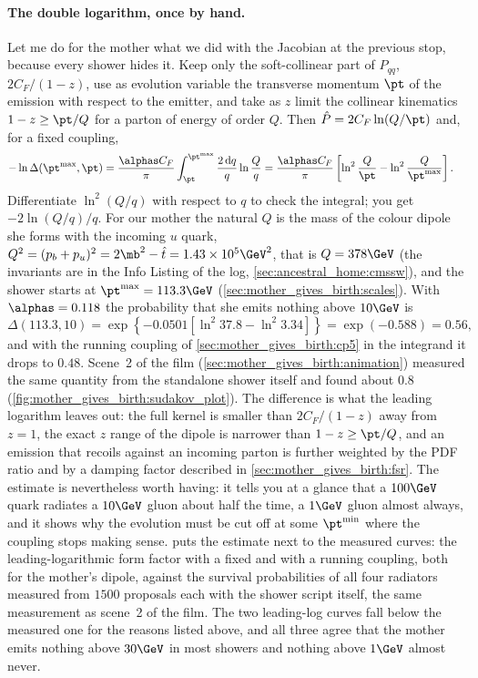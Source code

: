 \paragraph{The double logarithm, once by hand.} Let me do for the mother
what we did with the Jacobian at the previous stop, because every shower
hides it. Keep only the soft-collinear part of $P_{qq}$, $2C_F/(1-z)$,
use as evolution variable the transverse momentum $\pt$ of the emission with
respect to the emitter, and take as $z$ limit the collinear kinematics
$1-z\ge\pt/Q$ for a parton of energy of order $Q$. Then
$\hat P=2C_F\ln(Q/\pt)$ and, for a fixed coupling,
\begin{equation}
\begin{split}
  -\ln\Delta(\pt^{\max},\pt)
  &=\frac{\alphas C_F}{\pi}\int_{\pt}^{\pt^{\max}}\frac{2\,\mathrm{d}q}{q}\ln\frac{Q}{q}
  =\frac{\alphas C_F}{\pi}\left[\ln^2\frac{Q}{\pt}-\ln^2\frac{Q}{\pt^{\max}}\right].
\end{split}
  \label{eq:mother_gives_birth:double_log_sudakov}
\end{equation}
Differentiate $\ln^2(Q/q)$ with respect to $q$ to check the integral; you
get $-2\ln(Q/q)/q$. For our mother the natural $Q$ is the mass of the
colour dipole she forms with the incoming $u$ quark,
$Q^2=(p_b+p_u)^2=2\mb^2-\hat t=1.43\times10^{5}\GeV^2$, that is
$Q=378\GeV$ (the invariants are in the Info Listing of the \CMSSW log,
\cref{sec:ancestral_home:cmssw}), and the shower starts at
$\pt^{\max}=113.3\GeV$ (\cref{sec:mother_gives_birth:scales}). With
$\alphas=0.118$ the probability that she emits nothing above $10\GeV$ is
\begin{equation*}
  \Delta(113.3,10)=\exp\left\{-0.0501\left[\ln^2 37.8-\ln^2 3.34\right]\right\}
  =\exp(-0.588)=0.56 ,
\end{equation*}
and with the running coupling of \cref{sec:mother_gives_birth:cp5} in the
integrand it drops to $0.48$. Scene~2 of the film (\cref{sec:mother_gives_birth:animation})
measured the same quantity from the standalone shower itself and found
about $0.8$ (\cref{fig:mother_gives_birth:sudakov_plot}). The difference is what the leading logarithm leaves out: the
full kernel is smaller than $2C_F/(1-z)$ away from $z=1$, the exact $z$
range of the dipole is narrower than $1-z\ge\pt/Q$, and an emission that
recoils against an incoming parton is further weighted by the PDF ratio
and by a damping factor described in \cref{sec:mother_gives_birth:fsr}.
The estimate is nevertheless worth having: it tells you at a glance that a
$100\GeV$ quark radiates a $10\GeV$ gluon about half the time, a
$1\GeV$ gluon almost always, and it shows why the evolution must be cut off
at some $\pt^{\min}$ where the coupling stops making sense.
 puts the estimate next to the
measured curves: the leading-logarithmic form factor with a fixed and with a
running coupling, both for the mother's dipole, against the survival
probabilities of all four radiators measured from $1500$ proposals each
with the shower script itself, the same measurement as scene~2 of the film.
The two leading-log curves fall below the measured one for the reasons
listed above, and all three agree that the mother emits nothing above
$30\GeV$ in most showers and nothing above $1\GeV$ almost never.

